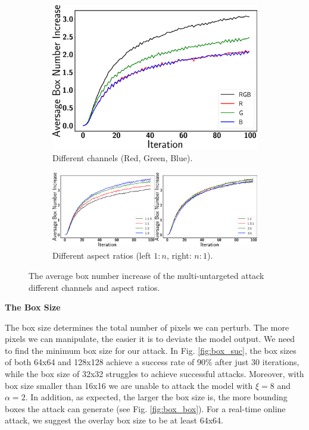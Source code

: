 \begin{figure}[t]
    \centering
    \begin{subfigure}[b]{0.3\textwidth}
        \includegraphics[width=\linewidth]{figures/chapter_detection/multi_untargeted_mono_box.png}
        \caption{Different channels (Red, Green, Blue).}
         \label{fig:mono_box}
    \end{subfigure}
    \begin{subfigure}[b]{0.6\textwidth}
        \includegraphics[width=1\linewidth]{figures/chapter_detection/multi_untargeted_aspect_box.png}
        \caption{Different aspect ratios (left $1:n$, right: $n:1$).}
         \label{fig:aspect_box}
    \end{subfigure}

    \caption{The average box number increase of the multi-untargeted attack different channels and aspect ratios.}
\end{figure}

\textbf{The Box Size}

The box size determines the total number of pixels we can perturb. The more pixels we can manipulate, the easier it is to deviate the model output. We need to find the minimum box size for our attack. In Fig. \ref{fig:box_suc}, the box sizes of both 64x64 and 128x128 achieve a success rate of 90\% after just 30 iterations, while the box size of 32x32 struggles to achieve successful attacks. Moreover, with box size smaller than 16x16 we are unable to attack the model with $\xi=8$ and $\alpha=2$. In addition, as expected, the larger the box size is, the more bounding boxes the attack can generate (see Fig. \ref{fig:box_box}). For a real-time online attack, we suggest the overlay box size to be at least 64x64.

